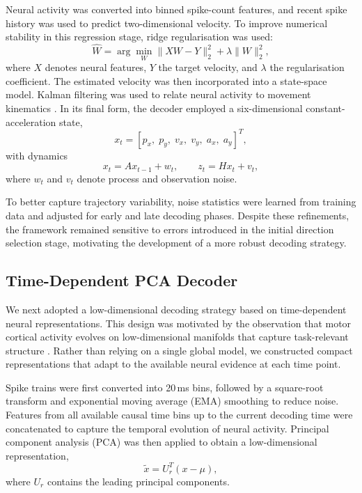 Neural activity was converted into binned spike-count features, and recent spike history was used to predict two-dimensional velocity. To improve numerical stability in this regression stage, ridge regularisation was used:
\begin{equation}
\hat{W} = \arg\min_{W} \|XW - Y\|_2^2 + \lambda \|W\|_2^2,
\label{eq:ridge}
\end{equation}
where $X$ denotes neural features, $Y$ the target velocity, and $\lambda$ the regularisation coefficient. The estimated velocity was then incorporated into a state-space model. Kalman filtering was used to relate neural activity to movement kinematics \cite{b4,b5}. In its final form, the decoder employed a six-dimensional constant-acceleration state,
\begin{equation}
x_t = [p_x,\; p_y,\; v_x,\; v_y,\; a_x,\; a_y]^T,
\label{eq:state}
\end{equation}
with dynamics
\begin{equation}
x_t = A x_{t-1} + w_t, \qquad z_t = H x_t + v_t,
\label{eq:kf}
\end{equation}
where $w_t$ and $v_t$ denote process and observation noise.

To better capture trajectory variability, noise statistics were learned from training data and adjusted for early and late decoding phases. Despite these refinements, the framework remained sensitive to errors introduced in the initial direction selection stage, motivating the development of a more robust decoding strategy.

\subsection{Time-Dependent PCA Decoder}

We next adopted a low-dimensional decoding strategy based on time-dependent neural representations. This design was motivated by the observation that motor cortical activity evolves on low-dimensional manifolds that capture task-relevant structure \cite{b2}. Rather than relying on a single global model, we constructed compact representations that adapt to the available neural evidence at each time point.

Spike trains were first converted into 20\,ms bins, followed by a square-root transform and exponential moving average (EMA) smoothing to reduce noise. Features from all available causal time bins up to the current decoding time were concatenated to capture the temporal evolution of neural activity. Principal component analysis (PCA) was then applied to obtain a low-dimensional representation,
\begin{equation}
\tilde{x} = U_r^{T}(x-\mu),
\label{eq:pca}
\end{equation}
where $U_r$ contains the leading principal components.


